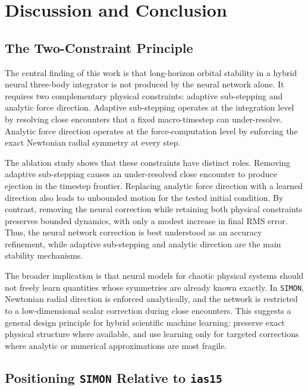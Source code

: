 \documentclass[12pt]{article}
\begin{document}
\section{Discussion and Conclusion}
\label{sec:discussion}

\subsection{The Two-Constraint Principle}

The central finding of this work is that long-horizon orbital stability in a hybrid
neural three-body integrator is not produced by the neural network alone. It requires
two complementary physical constraints: adaptive sub-stepping and analytic force
direction. Adaptive sub-stepping operates at the integration level by resolving close
encounters that a fixed macro-timestep can under-resolve. Analytic force direction
operates at the force-computation level by enforcing the exact Newtonian radial
symmetry at every step.

The ablation study shows that these constraints have distinct roles. Removing adaptive
sub-stepping causes an under-resolved close encounter to produce ejection in the timestep
frontier. Replacing analytic force direction with a learned direction also leads to
unbounded motion for the tested initial condition. By contrast, removing the neural
correction while retaining both physical constraints preserves bounded dynamics, with
only a modest increase in final RMS error. Thus, the neural network correction is best
understood as an accuracy refinement, while adaptive sub-stepping and analytic direction
are the main stability mechanisms.

The broader implication is that neural models for chaotic physical systems should not
freely learn quantities whose symmetries are already known exactly. In \texttt{SIMON},
Newtonian radial direction is enforced analytically, and the network is restricted to a
low-dimensional scalar correction during close encounters. This suggests a general design
principle for hybrid scientific machine learning: preserve exact physical structure where
available, and use learning only for targeted corrections where analytic or numerical
approximations are most fragile.

\subsection{Positioning \texttt{SIMON} Relative to \texttt{ias15}}
\end{document}
